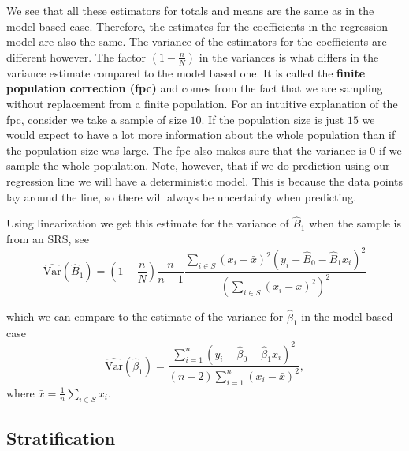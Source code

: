 \documentclass{article}
\begin{document}
We see that all these estimators for totals and means are the same as in the
model based case. Therefore, the estimates for the coefficients in the regression
model are also the same. The variance of the estimators for the coefficients are
different however.
The factor \(\left( 1 - \frac{n}{N} \right)\) in the variances is what differs in
the variance estimate compared to the model based one. It is called the
\textbf{finite population correction (fpc)} and comes from the fact that we are
sampling without replacement from a finite population.
For an intuitive explanation of the fpc, consider we take a sample of size
\(10\). If the population size is just \(15\) we would expect to have a lot more
information about the whole population than if the population size was large.
The fpc also makes sure that the variance is \(0\) if we sample the whole
population. Note, however, that if we do prediction using our regression line
we will have a deterministic model. This is because the data points lay around
the line, so there will always be uncertainty when predicting.

Using linearization we get this estimate for the variance of \(\hat{B}_1\) when
the sample is from an SRS, see \cite[Chapter 11.2]{sampReg}  \begin{equation*}
\widehat{\mathrm{Var}}(\hat{B}_1) = \left( 1 - \frac{n}{N} \right) \frac{n}{n - 1} \frac{\sum_{i \in S} \left( x_i - \bar{x} \right)^2 \left( y_i - \hat{B}_0 - \hat{B}_1 x_i \right)^2}
{\left( \sum_{i \in S} \left( x_i - \bar{x} \right)^2 \right)^2}
\end{equation*}

which we can compare to the estimate of the variance for \(\hat{\beta}_1\) in
the model based case
\begin{equation*}
 \widehat{\mathrm{Var}} \left( \hat{\beta}_1 \right) = \frac{\sum_{i = 1}^n\left( y_i - \hat{\beta}_0 -
 \hat{\beta}_1 x_i \right)^2}{
   \left( n - 2 \right)\sum_{i = 1}^n \left( x_i - \bar{x} \right)^2},
\end{equation*}
where \(\bar{x} = \frac{1}{n} \sum_{i \in S} x_i\).


\subsection{Stratification} \label{sec:strat}
\end{document}
